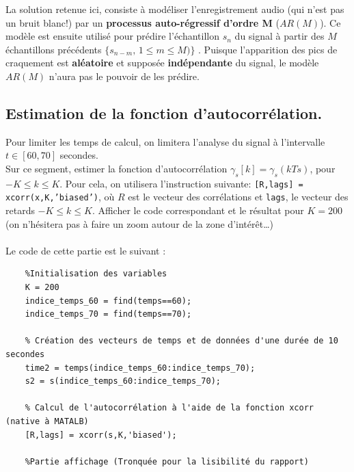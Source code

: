 \documentclass{article}
\begin{document}
\vspace*{3mm}
La solution retenue ici, consiste à modéliser l'enregistrement audio (qui n'est pas un bruit blanc!) par un \textbf{processus auto-régressif d'ordre M }($AR(M)$). Ce modèle est ensuite utilisé pour prédire l'échantillon  $s_n$ du signal à partir des $M$ échantillons précédents $\{s_{n-m},\,1 \leq m \leq M)\}$ . Puisque l'apparition des pics de craquement est \textbf{aléatoire} et supposée \textbf{indépendante} du signal, le modèle $AR(M)$ n'aura pas le pouvoir de  les prédire.

\newpage
\subsection{Estimation de la fonction d'autocorrélation.}

Pour limiter les temps de calcul, on limitera l'analyse du signal à l'intervalle $t\in[60,70]$ secondes. \\
Sur ce segment, estimer la fonction d'autocorrélation $\gamma_s[k] = \gamma_s(kTs)$, 
pour $-K\leq k \leq K$. Pour cela, on utilisera l'instruction suivante:  {\tt [R,lags] = xcorr(x,K,'biased')}, où $R$ est le vecteur des corrélations et {\tt lags}, le vecteur des retards $-K\leq k \leq K$. Afficher le code correspondant et le résultat pour $K=200$ (on n'hésitera pas à faire un zoom autour de la zone d'intérêt\ldots) \\ \\
Le code de cette partie est le suivant :  
\begin{verbatim}
    %Initialisation des variables
    K = 200
    indice_temps_60 = find(temps==60);
    indice_temps_70 = find(temps==70);
    
    % Création des vecteurs de temps et de données d'une durée de 10 secondes
    time2 = temps(indice_temps_60:indice_temps_70);
    s2 = s(indice_temps_60:indice_temps_70);
    
    % Calcul de l'autocorrélation à l'aide de la fonction xcorr (native à MATALB)
    [R,lags] = xcorr(s,K,'biased');
    
    %Partie affichage (Tronquée pour la lisibilité du rapport) 
\end{verbatim}
\end{document}
